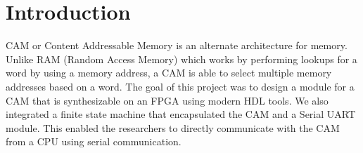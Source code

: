 \section{Introduction}
CAM or Content Addressable Memory is an alternate architecture for memory. Unlike RAM (Random Access Memory) which works by performing lookups for a word by using a memory address, a CAM is able to select multiple memory addresses based on a word.  
The goal of this project was to design a module for a CAM that is synthesizable on an FPGA using modern HDL tools. 
We also integrated a finite state machine that encapsulated the CAM and a Serial UART module. 
This enabled the researchers to directly communicate with the CAM from a CPU using serial communication. 
